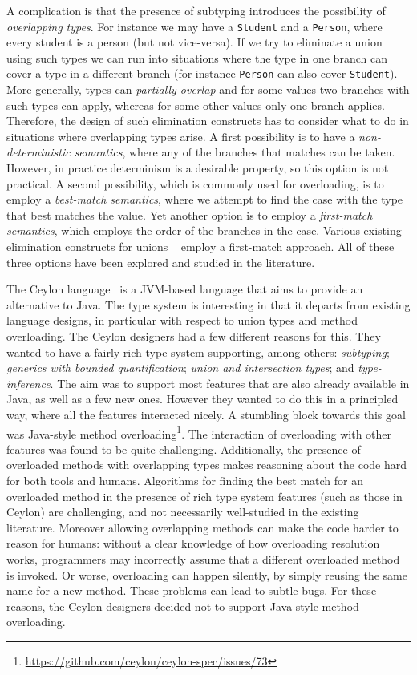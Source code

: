 A complication is that the presence of subtyping introduces the
possibility of \emph{overlapping types}. For instance we may have a
\lstinline{Student} and a \lstinline{Person}, where every student is a person (but not
vice-versa). If we try to eliminate a union using such types we can
run into situations where the type in one branch can cover a type in a
different branch (for instance \lstinline{Person} can also cover
\lstinline{Student}). More generally, types can \emph{partially overlap}
and for some values two branches with such types can apply, whereas
for some other values only one branch applies.
Therefore, the design of such elimination constructs has to
consider what to do in situations where overlapping types arise.  A
first possibility is to have a \emph{non-deterministic semantics},
where any of the branches that matches can be taken. However, in
practice determinism is a desirable property,
so this option is not practical. A second possibility, which is
commonly used for overloading, is to employ a \emph{best-match
  semantics}, where we attempt to find the case with the type that
best matches the value. Yet another option is to employ a
\emph{first-match semantics}, which employs the order of the branches
in the case. Various existing elimination constructs for unions
~\cite{benzaken2003cduce,castagna:settheoretic}
employ a first-match approach. All of these three options have been explored
and studied in the literature. 

The Ceylon language~\cite{king2013ceylon} is a JVM-based language that aims to provide an
alternative to Java. The type system is interesting
in that it departs from existing language designs, in particular
with respect to union types and method overloading.
The Ceylon designers had a few different
reasons for this. They wanted to have a fairly rich type system
supporting, among others: \emph{subtyping}; \emph{generics with bounded
quantification}; \emph{union and intersection types}; and \emph{type-inference}.
The aim was to support most features that are also already available
in Java, as well as a few new ones. However they wanted to do this in
a principled way, where all the features interacted nicely.  A
stumbling block towards this goal was Java-style method
overloading\footnote{\url{https://github.com/ceylon/ceylon-spec/issues/73}}.
The interaction of overloading with other
features was found to be quite challenging. Additionally, the presence of
overloaded methods with overlapping types
makes reasoning about the code hard 
for both tools and humans. Algorithms for finding the best match for an
overloaded method in the presence of rich type system features (such as
those in Ceylon) are challenging, and not necessarily well-studied in the
existing literature. Moreover allowing overlapping methods can make
the code harder to reason for humans: without a clear knowledge of how
overloading resolution works, programmers may incorrectly assume that
a different overloaded method is invoked. Or worse, overloading can
happen silently, by simply reusing the same name for a new
method. These problems can lead to subtle bugs.
For these reasons, the Ceylon designers decided not to support
Java-style method overloading.


